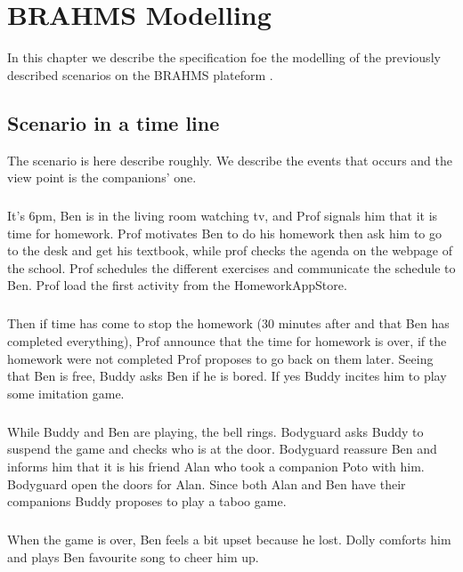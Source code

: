 \chapter{BRAHMS Modelling}
In this chapter we describe the specification foe the modelling of the previously described scenarios on the BRAHMS plateform \cite{BrahmUserGuide}. 

\section{Scenario in a time line}
The scenario is here describe roughly. We describe the events that occurs and the view point is the companions' one. 
\paragraph{}
It's 6pm, Ben is in the living room watching tv, and Prof signals him that it is time for homework.
Prof motivates Ben to do his homework then ask him to go to the desk and get his textbook, while prof checks the agenda on the webpage of the school. 
Prof schedules the different exercises and communicate the schedule to Ben.
Prof load the first activity from the Homework\-AppStore.
\paragraph{}
Then if time has come to stop the homework (30 minutes after and that Ben has completed everything), Prof announce that the time for homework is over, if the homework were not completed Prof proposes to go back on them later.
Seeing that Ben is free, Buddy asks Ben if he is bored. If yes Buddy incites him to play some imitation game.
\paragraph{}
While Buddy and Ben are playing, the bell rings. Bodyguard asks Buddy to suspend the game and checks who is at the door. Bodyguard reassure Ben and informs him that it is his friend Alan who took a companion Poto with him. 
Bodyguard open the doors for Alan. Since both Alan and Ben have their companions Buddy proposes to play a taboo game. 
\paragraph{}
When the game is over, Ben feels a bit upset because he lost.
Dolly comforts him and plays Ben favourite song to cheer him up.
